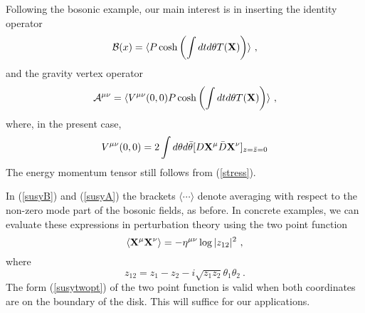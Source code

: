 \documentclass[a4paper,12pt]{article}
\begin{document}
 
Following the bosonic example, our main interest is in inserting the identity operator
\begin{equation}
{\cal B}(x) = \langle P \cosh\left( \int dt d\theta T({\bf X})\right) \rangle~,
\label{susyB}
\end{equation}
and the gravity vertex operator
\begin{equation}
{\cal A}^{\mu\nu} = \langle V^{\mu\nu}(0,0) P \cosh\left( \int dt d\theta T({\bf X})\right) \rangle~,
\label{susyA}
\end{equation}
where, in the present case,
\begin{equation}
V^{\mu\nu}(0,0) = 2 \int d\theta d\bar{\theta}
[D{\bf X}^\mu {\bar D}{\bf X}^\nu ]_{z=\bar{z}=0}
\end{equation}
The energy momentum tensor still follows from (\ref{stress}).

In (\ref{susyB}) and (\ref{susyA})  the brackets $\langle\cdots\rangle$ denote
averaging with respect to the non-zero mode part of the bosonic fields, as before.
In concrete examples, we can evaluate these expressions in perturbation theory 
using the two point function \cite{AT}
\begin{equation}
\langle {\bf X}^\mu {\bf X}^\nu \rangle = - \eta^{\mu\nu} \log |z_{12}|^2~,
\label{susytwopt}
\end{equation}
where
\begin{equation}
z_{12} = z_1 - z_2 - i \sqrt{z_1 z_2} \theta_1 \theta_2~. 
\end{equation}
The form (\ref{susytwopt}) of the two point function is valid when both
coordinates are on the boundary of the disk. 
This will suffice for our applications.
\end{document}
